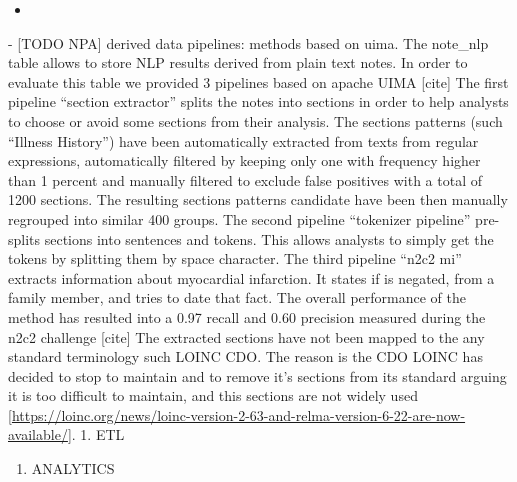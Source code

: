 \begin{itemize}
\item
\end{itemize}

- {[}TODO NPA{]} derived data pipelines: methods based on uima. The
note\_nlp table allows to store NLP results derived from plain text
notes. In order to evaluate this table we provided 3 pipelines based on
apache UIMA {[}cite{]} The first pipeline ``section extractor'' splits
the notes into sections in order to help analysts to choose or avoid
some sections from their analysis. The sections patterns (such ``Illness
History'') have been automatically extracted from texts from regular
expressions, automatically filtered by keeping only one with frequency
higher than 1 percent and manually filtered to exclude false positives
with a total of 1200 sections. The resulting sections patterns candidate
have been then manually regrouped into similar 400 groups. The second
pipeline ``tokenizer pipeline'' pre-splits sections into sentences and
tokens. This allows analysts to simply get the tokens by splitting them
by space character. The third pipeline ``n2c2 mi'' extracts information
about myocardial infarction. It states if is negated, from a family
member, and tries to date that fact. The overall performance of the
method has resulted into a 0.97 recall and 0.60 precision measured
during the n2c2 challenge {[}cite{]} The extracted sections have not
been mapped to the any standard terminology such LOINC CDO. The reason
is the CDO LOINC has decided to stop to maintain and to remove it's
sections from its standard arguing it is too difficult to maintain, and
this sections are not widely used
{[}\url{https://loinc.org/news/loinc-version-2-63-and-relma-version-6-22-are-now-available/}{]}.
1. ETL

\begin{enumerate}
\def\labelenumi{\arabic{enumi}.}
\setcounter{enumi}{1}
\tightlist
\item
  ANALYTICS
\end{enumerate}

